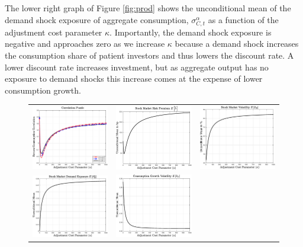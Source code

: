The lower right graph of Figure \ref{fig:prod} shows the unconditional mean of the  demand shock exposure of aggregate consumption, $\sigma^{\alpha}_{C,t}$ as a function of the adjustment cost parameter $\kappa$. Importantly, the demand shock exposure is negative and approaches zero as we increase $\kappa$ because a demand shock increases the consumption share of patient investors and thus lowers the discount rate. A lower discount rate increases investment, but as aggregate output has no exposure to demand shocks this increase comes at the expense of lower consumption growth. 
\begin{figure}[htbp] 
\centering
\vspace{0.1in}
\begin{tabular}{ccc}
\includegraphics[width=.3\textwidth]{figures/FigProdCorrpuzzle.eps} &
\includegraphics[width=.3\textwidth]{figures/FigProdRP.eps} &
\includegraphics[width=.3\textwidth]{figures/FigProdStdevS.eps}  \\
\includegraphics[width=.3\textwidth]{figures/FigProdsigalpS.eps}  &
\includegraphics[width=.3\textwidth]{figures/FigProdStdevC.eps} &

\end{tabular}
\end{figure}
